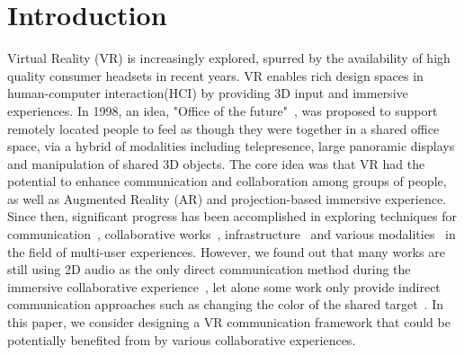 \documentclass{sigchi}
\begin{document}
\section{Introduction}
Virtual Reality (VR) is increasingly explored, spurred by the availability of high quality consumer headsets in recent years. VR enables rich design spaces in human-computer interaction(HCI) by providing 3D input and immersive experiences. In 1998, an idea, "Office of the future"~\cite{raskar1998office}, was proposed to support remotely located people to feel as though they were together in a shared office space, via a hybrid of modalities including telepresence, large panoramic displays and manipulation of shared 3D objects. The core idea was that VR had the potential to enhance communication and collaboration among groups of people, as well as Augmented Reality (AR) and projection-based immersive experience. Since then, significant progress has been accomplished in exploring techniques for communication~\cite{ishii1993integration, otsuka2016mmspace}, collaborative works~\cite{kunert2014photoportals,tang2010three}, infrastructure~\cite{maimone2013general, o2011blended, thomas2014muvr} and various modalities~\cite{follmer2013inform, leithinger2014physical, leithinger2015shape, nakagaki2019inforce} in the field of multi-user experiences. However, we found out that many works are still using 2D audio as the only direct communication method during the immersive collaborative experience~\cite{xia2018spacetime}, let alone some work only provide indirect communication approaches such as changing the color of the shared target~\cite{huo2018synchronizar}. In this paper, we consider designing a VR communication framework that could be potentially benefited from by various collaborative experiences.
\end{document}
